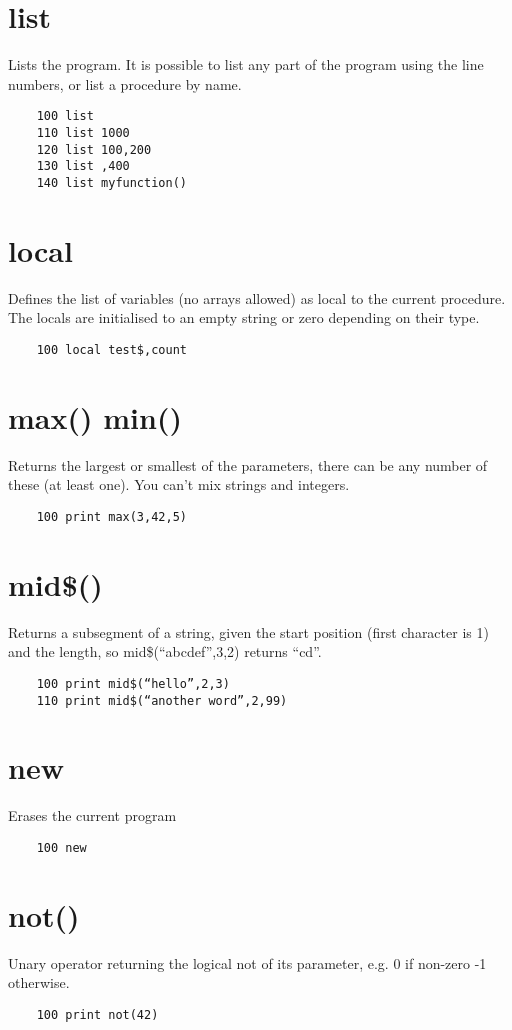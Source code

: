 \section*{list}
Lists the program.  It is possible to list any part of the program using the line numbers, or list a procedure by name.
\example{}
\begin{verbatim}
	100 list
	110 list 1000
	120 list 100,200
	130 list ,400
	140 list myfunction()
\end{verbatim}

\section*{local}
Defines the list of variables (no arrays allowed) as local to the current procedure. The locals are initialised to an empty string or zero depending on their type. 
\example{}
\begin{verbatim}
	100 local test$,count
\end{verbatim}

\section*{max() min()}
Returns the largest or smallest of the parameters, there can be any number of these (at least one). You can’t mix strings and integers.
\example{}
\begin{verbatim}
	100 print max(3,42,5)
\end{verbatim}

\section*{mid\$()}
Returns a subsegment of a string, given the start position (first character is 1) and the length, so mid\$(“abcdef”,3,2) returns “cd”. 
\example{}
\begin{verbatim}
	100 print mid$(“hello”,2,3)
	110 print mid$(“another word”,2,99)
\end{verbatim}

\section*{new}
Erases the current program
\example{}
\begin{verbatim}
	100 new
\end{verbatim}

\section*{not()}
Unary operator returning the logical not of its parameter, e.g. 0 if non-zero -1 otherwise.
\example{}
\begin{verbatim}
	100 print not(42)
\end{verbatim}

